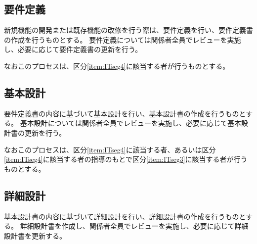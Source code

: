 





\subsection{要件定義}
新規機能の開発または既存機能の改修を行う際は、要件定義を行い、要件定義書の作成を行うものとする。
要件定義については関係者全員でレビューを実施し、必要に応じて要件定義書の更新を行う。

なおこのプロセスは、区分\ref{item:ITseg4}\hx に該当する者が行うものとする。

\subsection{基本設計}
要件定義書の内容に基づいて基本設計を行い、基本設計書の作成を行うものとする。
基本設計については関係者全員でレビューを実施し、必要に応じて基本設計書の更新を行う。

なおこのプロセスは、区分\ref{item:ITseg4}\hx に該当する者、あるいは区分\ref{item:ITseg4}\hx に該当する者の指導のもとで区分\ref{item:ITseg3}\hx に該当する者が行うものとする。

\subsection{詳細設計}
基本設計書の内容に基づいて詳細設計を行い、詳細設計書の作成を行うものとする。
詳細設計書を作成し、関係者全員でレビューを実施し、必要に応じて詳細設計書を更新する。


